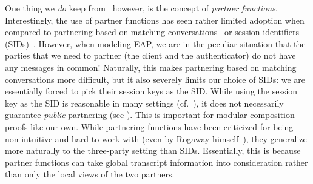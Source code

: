 One thing we \emph{do} keep from~\cite{STOC:BelRog95} however,
is the concept of \emph{partner functions}.
Interestingly,
the use of partner functions has seen rather limited adoption when compared to partnering based on matching conversations~\cite{C:BelRog93} or session identifiers (SIDs)~\cite{EC:BelPoiRog00}.
However,
when modeling EAP,
we are in the peculiar situation that the parties that we need to partner (the client and the authenticator) do not have any messages in common! 
Naturally,
this makes partnering based on matching conversations more difficult,
but it also severely limits our choice of SIDs: 
we are essentially forced to pick their session keys as the SID.
While using the session key as the SID is reasonable in many settings (cf.~\cite{ASIACCS:KobShiStr09}),
it does not necessarily guarantee \emph{public} partnering (see \cite{CCS:BFWW11}).
This is important for modular composition proofs like our own.
While partnering functions have been criticized for being non-intuitive and hard to work with 
(even by Rogaway himself~\cite[§6]{Rogaway:2004:role_of_definitions}),
they generalize more naturally to the three-party setting than SIDs.
Essentially,
this is because partner functions can take global transcript information into consideration rather than only the local views of the two partners.
%

